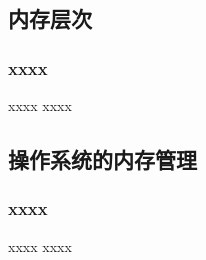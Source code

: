 \subsection{内存层次} %

\begin{frame}[plain,t]
    
    \frametitle{xxxx}
    
    
    \begin{block}{xxxx}
        xxxx

    \end{block} 
    
    
    \begin{figure}
        \centering
    \end{figure}
    
\end{frame}

\subsection{操作系统的内存管理} %

\begin{frame}[plain,t]
    
    \frametitle{xxxx}
    
    
    \begin{block}{xxxx}
        xxxx

    \end{block} 
    
    
    \begin{figure}
        \centering
    \end{figure}
    
\end{frame}


